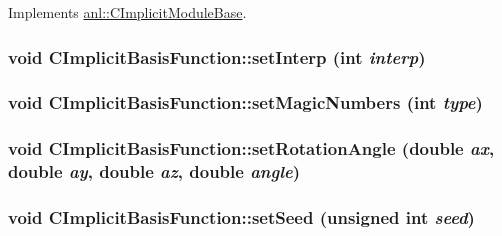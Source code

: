 Implements \hyperlink{classanl_1_1CImplicitModuleBase_ab88f8a1822dcfbc13ba5230318b0acd1}{anl::CImplicitModuleBase}.\hypertarget{classanl_1_1CImplicitBasisFunction_a24b23da12397b34651e07b637e6b7de4}{
\subsubsection[{setInterp}]{\setlength{\rightskip}{0pt plus 5cm}void CImplicitBasisFunction::setInterp (int {\em interp})}}
\label{classanl_1_1CImplicitBasisFunction_a24b23da12397b34651e07b637e6b7de4}
\hypertarget{classanl_1_1CImplicitBasisFunction_a398b6236011a569180b7a7479c7c8a49}{
\subsubsection[{setMagicNumbers}]{\setlength{\rightskip}{0pt plus 5cm}void CImplicitBasisFunction::setMagicNumbers (int {\em type})}}
\label{classanl_1_1CImplicitBasisFunction_a398b6236011a569180b7a7479c7c8a49}
\hypertarget{classanl_1_1CImplicitBasisFunction_ac3d28901ee0c7fb3e66100b5da63b22b}{
\subsubsection[{setRotationAngle}]{\setlength{\rightskip}{0pt plus 5cm}void CImplicitBasisFunction::setRotationAngle (double {\em ax}, \/  double {\em ay}, \/  double {\em az}, \/  double {\em angle})}}
\label{classanl_1_1CImplicitBasisFunction_ac3d28901ee0c7fb3e66100b5da63b22b}
\hypertarget{classanl_1_1CImplicitBasisFunction_a1fba23e4d106edd9cdc44dd52e116d2d}{
\subsubsection[{setSeed}]{\setlength{\rightskip}{0pt plus 5cm}void CImplicitBasisFunction::setSeed (unsigned int {\em seed})}}
\label{classanl_1_1CImplicitBasisFunction_a1fba23e4d106edd9cdc44dd52e116d2d}


